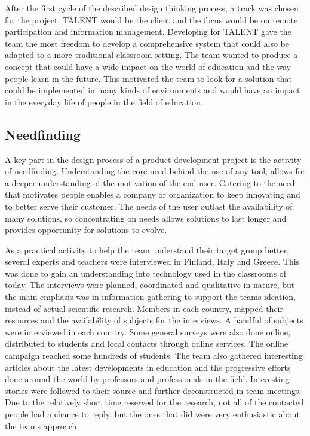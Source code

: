 \documentclass[english,12pt,a4paper,dvips]{article}
\begin{document}
After the first cycle of the described design thinking process, a track was chosen for the project, TALENT would be the client and the focus would be on remote participation and information management. Developing for TALENT gave the team the most freedom to develop a comprehensive system that could also be adapted to a more traditional classroom setting. The team wanted to produce a concept that could have a wide impact on the world of education and the way people learn in the future. This motivated the team to look for a solution that could be implemented in many kinds of environments and would have an impact in the everyday life of people in the field of education.


\subsection{Needfinding}

A key part in the design process of a product development project is the activity of needfinding. Understanding the core need behind the use of any tool, allows for a deeper understanding of the motivation of the end user. Catering to the need that motivates people enables a company or organization to keep innovating and to better serve their customer. The needs of the user outlast the availability of many solutions, so concentrating on needs allows solutions to last longer and provides opportunity for solutions to evolve. \cite{Patnaik} 

As a practical activity to help the team understand their target group better, several experts and teachers were interviewed in Finland, Italy and Greece. This was done to gain an understanding into technology used in the classrooms of today. The interviews were planned, coordinated and qualitative in nature, but the main emphasis was in information gathering to support the teams ideation, instead of actual scientific research. Members in each country, mapped their resources and the availability of subjects for the interviews. A handful of subjects were interviewed in each country. Some general surveys were also done online, distributed to students and local contacts through online services. The online campaign reached some hundreds of students. The team also gathered interesting articles about the latest developments in education and the progressive efforts done around the world by professors and professionals in the field. Interesting stories were followed to their source and further deconstructed in team meetings. Due to the relatively short time reserved for the research, not all of the contacted people had a chance to reply, but the ones that did were very enthusiastic about the teams approach. 
\end{document}
